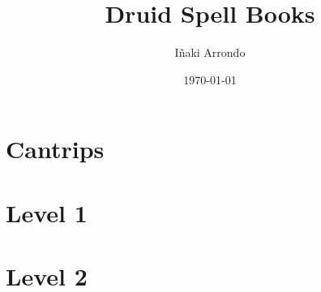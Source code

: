 \documentclass[a5paper,18pt]{book}
\title{Druid Spell Books}
\author{Iñaki Arrondo}
\date{\today}
\begin{document}
\large

\maketitle

\tableofcontents
\chapter{Cantrips}



















\chapter{Level 1}






















\chapter{Level 2}


























\end{document}
